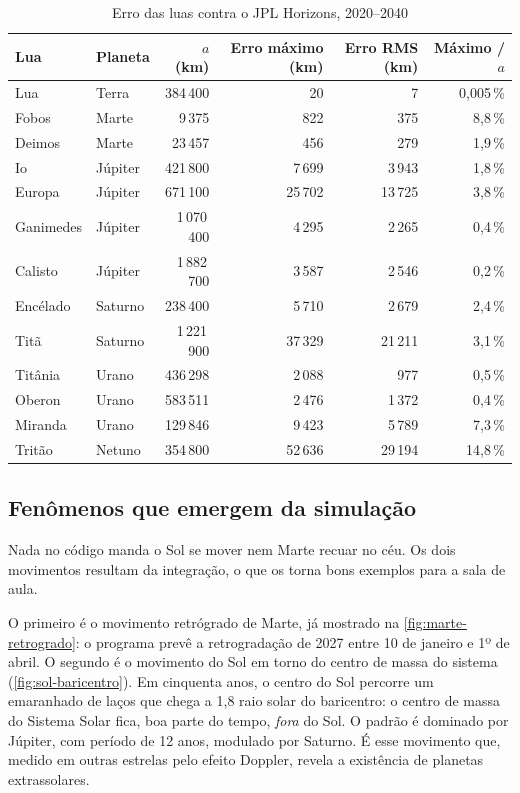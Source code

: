 \begin{table}[htb]
  \centering
  \caption{Erro das luas contra o JPL Horizons, 2020--2040}
  \label{tab:luas}
  \small
  \begin{tabular}{llrrrr}
    \toprule
    Lua & Planeta & $a$ (km) & Erro máximo (km) & Erro RMS (km) & Máximo / $a$ \\
    \midrule
    Lua      & Terra   & 384\,400   & 20      & 7       & 0,005\,\% \\
    Fobos    & Marte   & 9\,375     & 822     & 375     & 8,8\,\% \\
    Deimos   & Marte   & 23\,457    & 456     & 279     & 1,9\,\% \\
    Io       & Júpiter & 421\,800   & 7\,699  & 3\,943  & 1,8\,\% \\
    Europa   & Júpiter & 671\,100   & 25\,702 & 13\,725 & 3,8\,\% \\
    Ganimedes& Júpiter & 1\,070\,400 & 4\,295 & 2\,265  & 0,4\,\% \\
    Calisto  & Júpiter & 1\,882\,700 & 3\,587 & 2\,546  & 0,2\,\% \\
    Encélado & Saturno & 238\,400   & 5\,710  & 2\,679  & 2,4\,\% \\
    Titã     & Saturno & 1\,221\,900 & 37\,329 & 21\,211 & 3,1\,\% \\
    Titânia  & Urano   & 436\,298   & 2\,088  & 977     & 0,5\,\% \\
    Oberon   & Urano   & 583\,511   & 2\,476  & 1\,372  & 0,4\,\% \\
    Miranda  & Urano   & 129\,846   & 9\,423  & 5\,789  & 7,3\,\% \\
    Tritão   & Netuno  & 354\,800   & 52\,636 & 29\,194 & 14,8\,\% \\
    \bottomrule
  \end{tabular}
\end{table}

\subsection{Fenômenos que emergem da simulação}

Nada no código manda o Sol se mover nem Marte recuar no céu. Os dois movimentos resultam da integração, o que os torna bons exemplos para a sala de aula.

O primeiro é o movimento retrógrado de Marte, já mostrado na \autoref{fig:marte-retrogrado}: o programa prevê a retrogradação de 2027 entre 10 de janeiro e 1º de abril. O segundo é o movimento do Sol em torno do centro de massa do sistema (\autoref{fig:sol-baricentro}). Em cinquenta anos, o centro do Sol percorre um emaranhado de laços que chega a 1,8 raio solar do baricentro: o centro de massa do Sistema Solar fica, boa parte do tempo, \emph{fora} do Sol. O padrão é dominado por Júpiter, com período de 12 anos, modulado por Saturno. É esse movimento que, medido em outras estrelas pelo efeito Doppler, revela a existência de planetas extrassolares.

